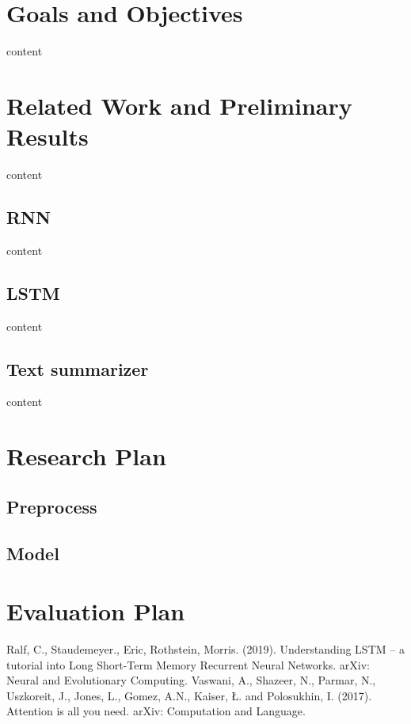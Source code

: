 \documentclass[conference]{IEEEtran}
\begin{document}
\section{Goals and Objectives}
content

\section{Related Work and Preliminary Results}
content 
\subsection{RNN}
content
\subsection{LSTM}
content
\subsection{Text summarizer}
content

\section{Research Plan}
\subsection{Preprocess}
\subsection{Model}

\section{Evaluation Plan}

\begin{thebibliography}{1,2}
Ralf, C., Staudemeyer., Eric, Rothstein, Morris. (2019). Understanding LSTM -- a tutorial into Long Short-Term Memory Recurrent Neural Networks. arXiv: Neural and Evolutionary Computing.
Vaswani, A., Shazeer, N., Parmar, N., Uszkoreit, J., Jones, L., Gomez, A.N., Kaiser, Ł. and Polosukhin, I. (2017). Attention is all you need. arXiv: Computation and Language.
\end{thebibliography}
\end{document}
